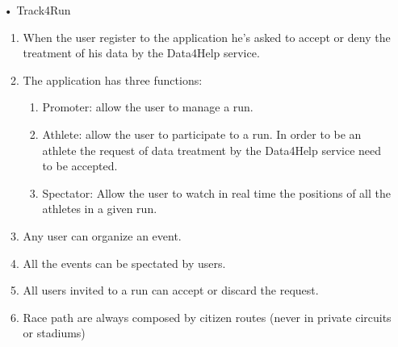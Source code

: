 \begin{enumerate}
\item[•] {\Large Track4Run}
	\begin{enumerate}
	\item When the user register to the application he's asked to accept or deny the treatment of his data by the Data4Help service.
	\item The application has three functions: 
	\begin{enumerate}
	\item Promoter: allow the user to manage a run.  
	\item Athlete: allow the user to participate to a run. In order to be an athlete the request of data treatment by the Data4Help service need to be accepted.
	\item Spectator: Allow the user to watch in real time the positions of all the athletes in a given run.
	\end{enumerate}
	\item Any user can organize an event.
    \item All the events can be spectated by users.
    \item All users invited to a run can accept or discard the request.
    \item Race path are always composed by citizen routes (never in private circuits or stadiums)
    \end{enumerate}
\end{enumerate}

